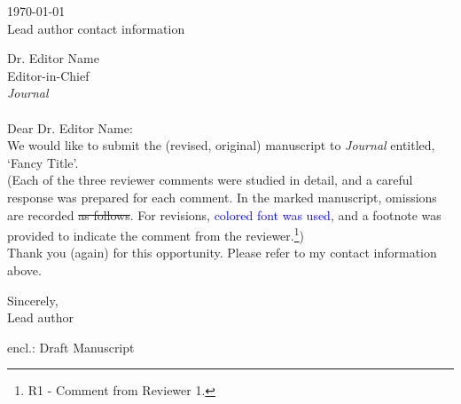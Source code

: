 \documentclass[11pt,a4paper]{article}
\newcommand{\edit}[1]{\textcolor{blue}{#1}} %
\newcommand{\fn}[1]{\footnote{#1}} %
\begin{document}
\thispagestyle{empty} %

\begin{flushright}
    \today \\
    Lead author contact information
\end{flushright}

\noindent Dr. Editor Name \\
Editor-in-Chief \\
\textit{Journal} \\ \\

\noindent Dear Dr. Editor Name: \\

\noindent We would like to submit the (revised, original) manuscript to \textit{Journal} entitled, `Fancy Title'. \\

\noindent (Each of the three reviewer comments were studied in detail, and a careful response was prepared for each comment. In the marked manuscript, omissions are recorded \sout{as follows}. For revisions, \edit{colored font was used}, and a footnote was provided to indicate the comment from the reviewer.\fn{R1 - Comment from Reviewer 1.})\\

\noindent Thank you (again) for this opportunity. Please refer to my contact information above. 

\vspace*{\fill}
\begin{flushright}
    Sincerely,\\
    Lead author
\end{flushright}
\noindent \small{encl.: Draft Manuscript} %
\end{document}
